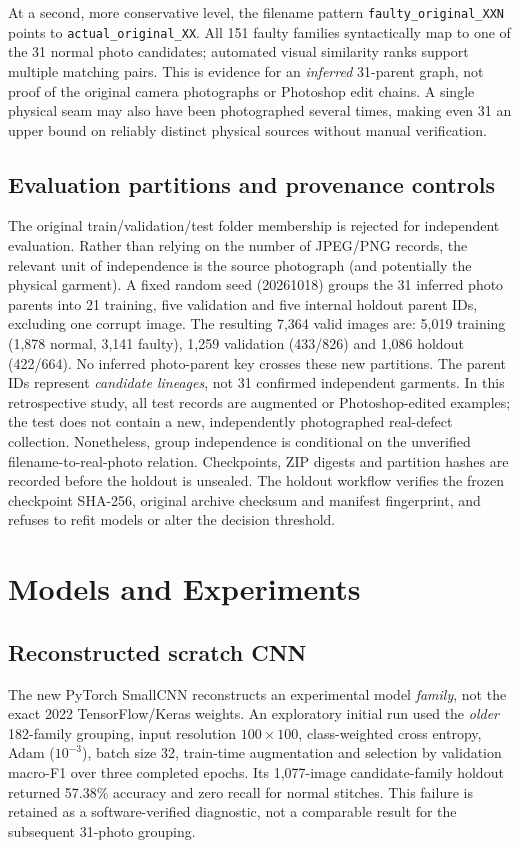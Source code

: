 \documentclass[conference,a4paper]{IEEEtran}
\begin{document}
At a second, more conservative level, the filename pattern \texttt{faulty\_original\_XXN} points to \texttt{actual\_original\_XX}. All 151 faulty families syntactically map to one of the 31 normal photo candidates; automated visual similarity ranks support multiple matching pairs. This is evidence for an \emph{inferred} 31-parent graph, not proof of the original camera photographs or Photoshop edit chains. A single physical seam may also have been photographed several times, making even 31 an upper bound on reliably distinct physical sources without manual verification.

\subsection{Evaluation partitions and provenance controls}
The original train/validation/test folder membership is rejected for independent evaluation. Rather than relying on the number of JPEG/PNG records, the relevant unit of independence is the source photograph (and potentially the physical garment). A fixed random seed (20261018) groups the 31 inferred photo parents into 21 training, five validation and five internal holdout parent IDs, excluding one corrupt image. The resulting 7,364 valid images are: 5,019 training (1,878 normal, 3,141 faulty), 1,259 validation (433/826) and 1,086 holdout (422/664). No inferred photo-parent key crosses these new partitions. The parent IDs represent \emph{candidate lineages}, not 31 confirmed independent garments. In this retrospective study, all test records are augmented or Photoshop-edited examples; the test does not contain a new, independently photographed real-defect collection. Nonetheless, group independence is conditional on the unverified filename-to-real-photo relation. Checkpoints, ZIP digests and partition hashes are recorded before the holdout is unsealed. The holdout workflow verifies the frozen checkpoint SHA-256, original archive checksum and manifest fingerprint, and refuses to refit models or alter the decision threshold.

\section{Models and Experiments}
\subsection{Reconstructed scratch CNN}
The new PyTorch SmallCNN reconstructs an experimental model \emph{family}, not the exact 2022 TensorFlow/Keras weights. An exploratory initial run used the \emph{older} 182-family grouping, input resolution $100\times100$, class-weighted cross entropy, Adam ($10^{-3}$), batch size 32, train-time augmentation and selection by validation macro-F1 over three completed epochs. Its 1,077-image candidate-family holdout returned 57.38\% accuracy and zero recall for normal stitches. This failure is retained as a software-verified diagnostic, not a comparable result for the subsequent 31-photo grouping.
\end{document}
